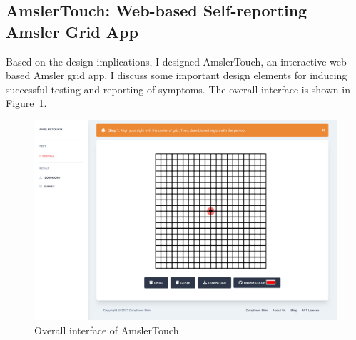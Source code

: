 \subsection{AmslerTouch: Web-based Self-reporting Amsler Grid App}

Based on the design implications, I designed AmslerTouch, an interactive web-based Amsler grid app. I discuss some important design elements for inducing successful testing and reporting of symptoms. The overall interface is shown in Figure~\ref{fig:interface}.

\begin{figure}[h!]
    \centering
    \includegraphics[width=.9\linewidth]{figure/dashboard.jpg}
    \caption{Overall interface of AmslerTouch}
    \label{fig:interface}
\end{figure}


